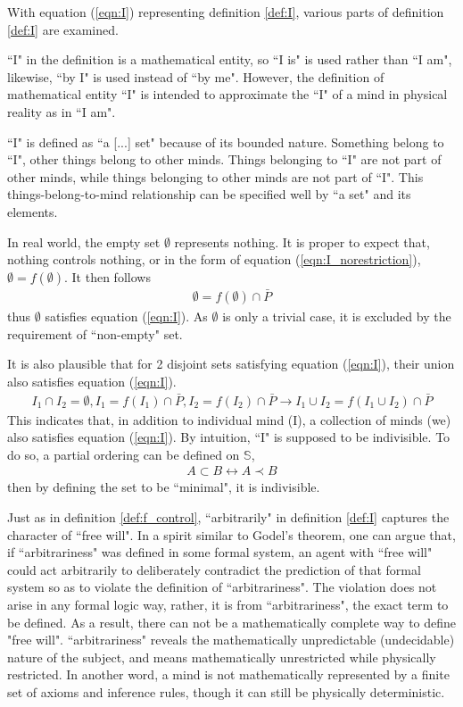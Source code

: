 \documentclass[final,leqno]{siamltex}
\begin{document}
With equation (\ref{eqn:I}) representing definition \ref{def:I}, various parts of definition \ref{def:I} are examined.

``I" in the definition is a mathematical entity, so ``I is" is used rather than ``I am", likewise, ``by I" is used instead of ``by me". However, the definition of mathematical entity ``I" is intended to approximate the ``I" of a mind in physical reality as in ``I am".

``I" is defined as ``a [...] set" because of its bounded nature. Something belong to ``I", other things belong to other minds. Things belonging to ``I" are not part of other minds, while things belonging to other minds are not part of ``I". This things-belong-to-mind relationship can be specified well by ``a set" and its elements.

In real world, the empty set $\emptyset$ represents nothing. It is proper to expect that, nothing controls nothing, or in the form of equation (\ref{eqn:I_norestriction}), $\emptyset=f(\emptyset)$. It then follows
\begin{eqnarray}
\emptyset=f(\emptyset)\cap \bar P
\end{eqnarray}
thus $\emptyset$ satisfies equation (\ref{eqn:I}). As $\emptyset$ is only a trivial case, it is excluded by the requirement of ``non-empty" set.

It is also plausible that for 2 disjoint sets satisfying equation (\ref{eqn:I}), their union also satisfies equation (\ref{eqn:I}). \begin{eqnarray}
I_1\cap I_2=\emptyset, I_1=f(I_1)\cap \bar P, I_2=f(I_2)\cap \bar P \rightarrow I_1\cup I_2=f(I_1\cup I_2)\cap \bar P
\end{eqnarray}
This indicates that, in addition to individual mind (I), a collection of minds (we) also satisfies equation (\ref{eqn:I}). By intuition, ``I" is supposed to be indivisible. To do so, a partial ordering can be defined on $\mathbb{S}$,
\begin{eqnarray}
\label{eqn:ordering}
A\subset B \leftrightarrow A\prec B
\end{eqnarray}
then by defining the set to be ``minimal", it is indivisible.

Just as in definition \ref{def:f_control}, ``arbitrarily" in definition \ref{def:I} captures the character of ``free will". In a spirit similar to Godel's theorem\cite{Godel}, one can argue that, if ``arbitrariness" was defined in some formal system, an agent with ``free will" could act arbitrarily to deliberately contradict the prediction of that formal system so as to violate the definition of ``arbitrariness". The violation does not arise in any formal logic way, rather, it is from ``arbitrariness", the exact term to be defined. As a result, there can not be a mathematically complete way to define "free will". ``arbitrariness" reveals the mathematically unpredictable (undecidable) nature of the subject, and means mathematically unrestricted while physically restricted. In another word, a mind is not mathematically represented by a finite set of axioms and inference rules, though it can still be physically deterministic.
\end{document}
